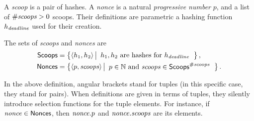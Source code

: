 A \emph{scoop} is a pair of hashes.
A \emph{nonce} is a natural \emph{progressive number} $p$, and
a list of ${\#\mathit{scoops}}>0$ scoops.
Their definitions are parametric \wrt a hashing function $h_{\mathit{deadline}}$ used for their creation.
%
\begin{definition}
  The sets of \emph{scoops} and \emph{nonces} are
  \begin{align*}
    {\mathsf{Scoops}}&=\left\{\langle h_1,h_2\rangle\left|\begin{array}{l}
    h_1,h_2\text{ are hashes for }h_{\mathit{deadline}}
    \end{array}\right.\right\},\\
    {\mathsf{Nonces}}&=\left\{\langle p,{\mathit{scoops}}\rangle\left|\begin{array}{l}
    p\in\mathbb{N}\text{ and }{\mathit{scoops}}\in{\mathsf{Scoops}}^{\#\mathit{scoops}}
    \end{array}\right.\right\}.
  \end{align*}
\end{definition}
%
In the above definition, angular brackets stand for tuples (in this specific
case, they stand for pairs). When definitions are given in terms of tuples,
they silently introduce selection functions
for the tuple elements. For instance, if ${\mathit{nonce}}\in{\mathsf{Nonces}}$, then ${\mathit{nonce}}.p$
and ${\mathit{nonce}}.{\mathit{scoops}}$ are its elements.

